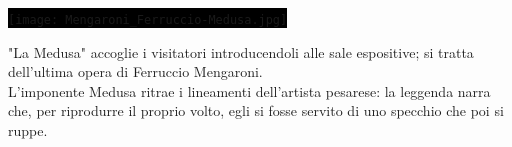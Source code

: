 \documentclass[hidelinks,12pt,a4paper,openright,twoside]{book}
\begin{document}
	
	\pagestyle{empty}
	
	\begin{center}
		\vspace*{15mm}
	\end{center}
	
	\newpage
	
		
			\begin{minipage}{0.5\linewidth}
				\begin{center}
					\colorbox{black}{\texttt{[image: Mengaroni\_Ferruccio-Medusa.jpg]}}
				\end{center}
				\begin{center}
					\begin{minipage}{\linewidth}
						\raggedright
						"La Medusa" accoglie i visitatori introducendoli alle sale espositive; si tratta dell'ultima opera di Ferruccio Mengaroni.\\
						L'imponente Medusa ritrae i lineamenti dell'artista pesarese: la leggenda narra che, per riprodurre il proprio volto, egli si fosse servito di uno specchio che poi si ruppe.
					\end{minipage}
			\end{center}
			\end{minipage}
		
		\vspace{10mm}
		
\end{document}
